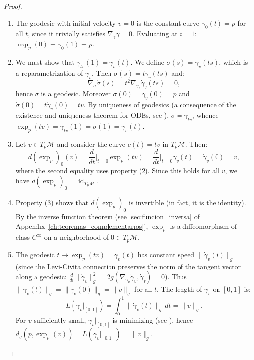 \begin{proof}
\leavevmode
\begin{enumerate}
	\item The geodesic with initial velocity $v = 0$ is the constant curve $\gamma_0(t) = p$ for all $t$, since it trivially satisfies $\nabla_{\dot{\gamma}} \dot{\gamma} = 0$. Evaluating at $t = 1$: $\exp_p(0) = \gamma_0(1) = p$.

	\item We must show that $\gamma_{tv}(1) = \gamma_v(t)$. We define $\sigma(s) = \gamma_v(ts)$, which is a reparametrization of $\gamma_v$. Then $\dot{\sigma}(s) = t \dot{\gamma}_v(ts)$ and:
	\[
	\nabla_{\dot{\sigma}} \dot{\sigma}(s) = t^2 \nabla_{\dot{\gamma}_v} \dot{\gamma}_v(ts) = 0,
	\]
	hence $\sigma$ is a geodesic. Moreover $\sigma(0) = \gamma_v(0) = p$ and $\dot{\sigma}(0) = t \dot{\gamma}_v(0) = tv$. By uniqueness of geodesics (a consequence of the existence and uniqueness theorem for ODEs, see \citep[Theorem~4.10]{lee2018introduction}), $\sigma = \gamma_{tv}$, whence $\exp_p(tv) = \gamma_{tv}(1) = \sigma(1) = \gamma_v(t)$.

	\item Let $v \in T_p\mathcal{M}$ and consider the curve $c(t) = tv$ in $T_p\mathcal{M}$. Then:
	\[
	d(\exp_p)_0(v) = \frac{d}{dt}\bigg|_{t=0} \exp_p(tv) = \frac{d}{dt}\bigg|_{t=0} \gamma_v(t) = \dot{\gamma}_v(0) = v,
	\]
	where the second equality uses property (2). Since this holds for all $v$, we have $d(\exp_p)_0 = \operatorname{id}_{T_p\mathcal{M}}$.

	\item Property (3) shows that $d(\exp_p)_0$ is invertible (in fact, it is the identity). By the inverse function theorem (see \autoref{sec:funcion_inversa} of Appendix~\ref{ch:teoremas_complementarios}), $\exp_p$ is a diffeomorphism of class $C^\infty$ on a neighborhood of $0 \in T_p\mathcal{M}$.

	\item The geodesic $t \mapsto \exp_p(tv) = \gamma_v(t)$ has constant speed $\|\dot{\gamma}_v(t)\|_g$ (since the Levi-Civita connection preserves the norm of the tangent vector along a geodesic: $\frac{d}{dt}\|\dot{\gamma}_v\|_g^2 = 2g(\nabla_{\dot{\gamma}_v}\dot{\gamma}_v, \dot{\gamma}_v) = 0$). Thus $\|\dot{\gamma}_v(t)\|_g = \|\dot{\gamma}_v(0)\|_g = \|v\|_g$ for all $t$. The length of $\gamma_v$ on $[0,1]$ is:
	\[
	L(\gamma_v|_{[0,1]}) = \int_0^1 \|\dot{\gamma}_v(t)\|_g \, dt = \|v\|_g.
	\]
	For $v$ sufficiently small, $\gamma_v|_{[0,1]}$ is minimizing (see \citep[Theorem~6.15]{lee2018introduction}), hence $d_g(p, \exp_p(v)) = L(\gamma_v|_{[0,1]}) = \|v\|_g$. \qedhere
\end{enumerate}
\end{proof}

